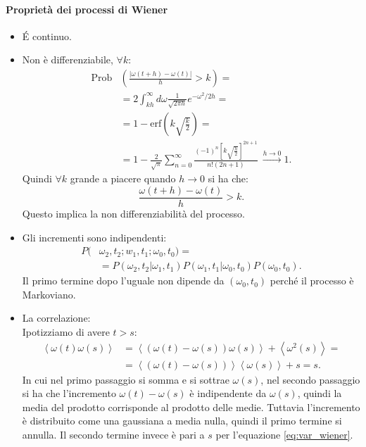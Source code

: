 \paragraph{Proprietà dei processi di Wiener}%
\label{par:Proprietà dei processi di Wiener}
\begin{itemize}
    \item \'E continuo.
    \item Non è differenziabile, $\forall k$:
	\[\begin{aligned}
	    \text{Prob}&\left(\frac{\left|\omega (t+h) - \omega (t) \right|}{h}> k\right) = \\
		       & = 2 \int_{kh}^{\infty} d\omega  \frac{1}{\sqrt{2\pi  h}} e^{- \omega^2 /2h} = \\
		       &=1-\mbox{erf}\left(k \sqrt{\frac{k}{2}} \right) = \\
		       &=1- \frac{2}{\sqrt{\pi} } \sum_{n=0}^{\infty} \frac{(-1)^n \left[k\sqrt{\frac{h}{2}} \right]^{2n + 1}}{n! (2n+1) }
		       \ \xrightarrow[]{h\to 0} 1
	.\end{aligned}\]
	Quindi $\forall k$ grande a piacere quando $h\to 0$ si ha che:
	\[
	    \frac{\omega (t + h)-\omega (t)}{h}>k
	.\] 
	Questo implica la non differenziabilità del processo.
    \item Gli incrementi sono indipendenti:
	\[\begin{aligned}
	    P(&\omega_2, t_2; w_1,t_1; \omega_0,t_0) = \\
	      &= P(\omega_2, t_2|\omega_1,t_1) P(\omega_1, t_1|\omega_0,t_0) P(\omega_0,t_0) 
	.\end{aligned}\]
	Il primo termine dopo l'uguale non dipende da $(\omega_0,t_0)$ perché il processo è Markoviano.
    \item La correlazione: \\
	Ipotizziamo di avere $t>s$:
	\[\begin{aligned}
	    \left<\omega (t) \omega (s)\right> &= \left<\left(\omega (t) -\omega (s)\right)\omega (s) \right>+\left<\omega^2(s) \right> =\\
					       &=\left<\left(\omega (t)-\omega (s)\right)\right>\left<\omega(s)\right> + s = s
	.\end{aligned}\]
    In cui nel primo passaggio si somma e si sottrae $\omega (s)$, nel secondo passaggio si ha che l'incremento $\omega (t)-\omega (s)$ è indipendente da $\omega (s)$, quindi la media del prodotto corrisponde al prodotto delle medie. Tuttavia l'incremento è distribuito come una gaussiana a media nulla, quindi il primo termine si annulla. Il secondo termine invece è pari a $s$ per l'equazione \ref{eq:var_wiener}.\\

\end{itemize}
